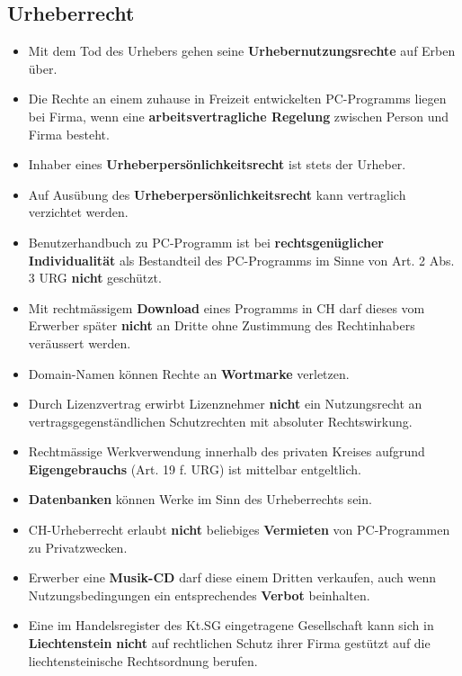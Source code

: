 \subsection{Urheberrecht}
\begin{itemize}
	\item Mit dem Tod des Urhebers gehen seine \textbf{Urhebernutzungsrechte} auf Erben über.
	\item Die Rechte an einem zuhause in Freizeit entwickelten PC-Programms liegen bei Firma, wenn eine \textbf{arbeitsvertragliche Regelung} zwischen Person und Firma besteht.
	\item Inhaber eines \textbf{Urheberpersönlichkeitsrecht} ist stets der Urheber.
	\item Auf Ausübung des \textbf{Urheberpersönlichkeitsrecht} kann vertraglich verzichtet werden.
	\item Benutzerhandbuch zu PC-Programm ist bei \textbf{rechtsgenüglicher Individualität} als Bestandteil des PC-Programms im Sinne von Art. 2 Abs. 3 URG \textbf{nicht} geschützt.
	\item Mit rechtmässigem \textbf{Download} eines Programms in CH darf dieses vom Erwerber später \textbf{nicht} an Dritte ohne Zustimmung des Rechtinhabers veräussert werden.
	\item Domain-Namen können Rechte an \textbf{Wortmarke} verletzen.
	\item Durch Lizenzvertrag erwirbt Lizenznehmer \textbf{nicht} ein Nutzungsrecht an vertragsgegenständlichen Schutzrechten mit absoluter Rechtswirkung.
	\item Rechtmässige Werkverwendung innerhalb des privaten Kreises aufgrund \textbf{Eigengebrauchs} (Art. 19 f. URG) ist mittelbar entgeltlich.
	\item \textbf{Datenbanken} können Werke im Sinn des Urheberrechts sein.
	\item CH-Urheberrecht erlaubt \textbf{nicht} beliebiges \textbf{Vermieten} von PC-Programmen zu Privatzwecken.
	\item Erwerber eine \textbf{Musik-CD} darf diese einem Dritten verkaufen, auch wenn Nutzungsbedingungen ein entsprechendes \textbf{Verbot} beinhalten.
	\item Eine im Handelsregister des Kt.SG eingetragene Gesellschaft kann sich in \textbf{Liechtenstein} \textbf{nicht} auf rechtlichen Schutz ihrer Firma gestützt auf die liechtensteinische Rechtsordnung berufen.
\end{itemize}

